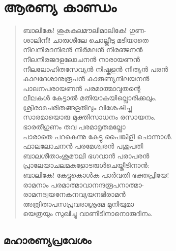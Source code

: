 \chapter{ആരണ്യ കാണ്ഡം}

\begin{verse}
ബാലികേ! ശുകകുലമൗലിമാലികേ! ഗുണ-\\
ശാലിനീ! ചാരുശീലേ ചൊല്ലീടു മടിയാതെ\\
നീലനീരദനിഭന്‍ നിര്‍മലന്‍ നിരഞ്ജനന്‍\\
നീലനീരജദളലോചനന്‍ നാരായണന്‍\\
നീലലോഹിതസേവ്യന്‍ നിഷ്കളന്‍ നിത്യന്‍ പരന്‍\\
കാലദേശാനുരൂപന്‍ കാരുണ്യനിലയനന്‍\\
പാലനപരായണന്‍ പരമാത്മാവുതന്റെ\\
ലീലകള്‍ കേട്ടാല്‍ മതിയാകയില്ലൊരിക്കലും.\\
ശ്രീരാമചരിതങ്ങളതിലും വിശേഷിച്ചു\\
സാരമായൊരു മുക്തിസാധനം രസായനം.\\
ഭാരതീഗുണം തവ പരമാമൃതമല്ലോ\\
പാരാതെ പറകെന്നു കേട്ടു പൈങ്കിളി ചൊന്നാള്‍.\\
ഫാലലോചനന്‍ പരമേശ്വരന്‍ പശുപതി\\
ബാലശീതാംശുമൗലി ഭഗവാന്‍ പരാപരന്‍\\
പ്രാലേയാചലമകളോടരുള്‍ചെയ്തീടിനാന്‍:\\
ബാലികേ! കേട്ടുകൊള്‍ക പാര്‍വതി ഭക്തപ്രിയേ!\\
രാമനാം പരമാത്മാവാനന്ദരൂപനാത്മാ-\\
രാമനദ്വയനേകനവ്യയനഭിരാമന്‍\\
അത്രിതാപസപ്രവരാശ്രമേ മുനിയുമാ-\\
യെത്രയും സുഖിച്ചു വാണീടിനാനൊരുദിനം.
\end{verse}

\section{മഹാരണ്യപ്രവേശം}

